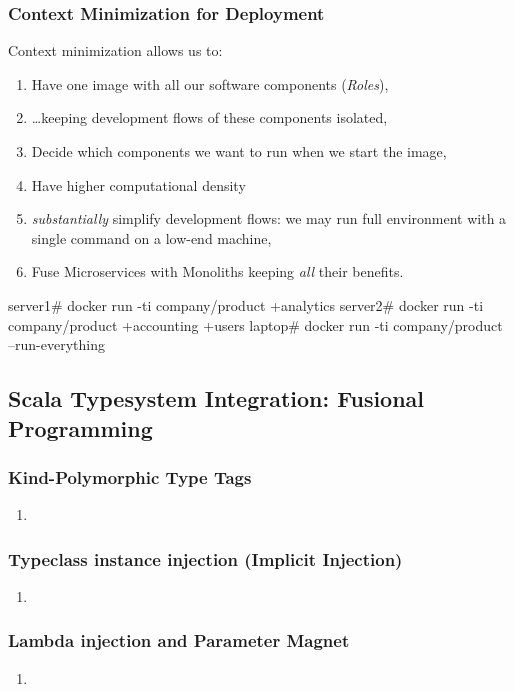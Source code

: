 \documentclass[usenames,dvipsnames]{beamer}
\begin{document}
\begin{frame}[fragile]
\frametitle{Context Minimization for Deployment}
Context minimization allows us to:
\begin{enumerate}
\item Have one image with all our software components (\textit{Roles}\footnotemark[1]),
\item \dots keeping development flows of these components isolated,
\item Decide which components we want to run when we start the image,
\item Have higher computational density 
\item \textit{substantially} simplify development flows: we may run full environment with a single command on a low-end machine, 
\item Fuse Microservices with Monoliths keeping \textit{all} their benefits.
\end{enumerate}

\begin{textcode}
server1# docker run -ti company/product +analytics
server2# docker run -ti company/product +accounting +users
laptop# docker run -ti company/product --run-everything
\end{textcode}

\end{frame}

\subsection{Scala Typesystem Integration: Fusional Programming}

\begin{frame}
\frametitle{Kind-Polymorphic Type Tags}
\begin{enumerate}
\item 
\end{enumerate}
\end{frame}

\begin{frame}
\frametitle{Typeclass instance injection (Implicit Injection)}
\begin{enumerate}
\item 
\end{enumerate}
\end{frame}

\begin{frame}
\frametitle{Lambda injection and Parameter Magnet}
\begin{enumerate}
\item 
\end{enumerate}
\end{frame}
\end{document}
